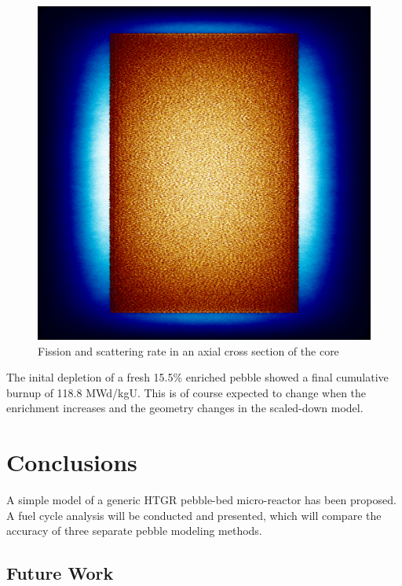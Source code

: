 \documentclass{anstrans}
\begin{document}
\begin{figure}[H]
  \centering
  \includegraphics[width = \linewidth]{htgr-mr-full-core-radial-mesh}
  \caption{Fission and scattering rate in an axial cross section of the core}
  \label{fig:axial-fission-scatter}
\end{figure}

The inital depletion of a fresh 15.5\% enriched pebble showed a final cumulative burnup of 118.8 MWd/kgU.  This is of course expected to change when the enrichment increases and the geometry changes in the scaled-down model.



\section{Conclusions}

A simple model of a generic HTGR pebble-bed micro-reactor has been proposed.  A fuel cycle analysis will be conducted and presented, which will compare the accuracy of three separate pebble modeling methods.

\subsection{Future Work}
\end{document}
